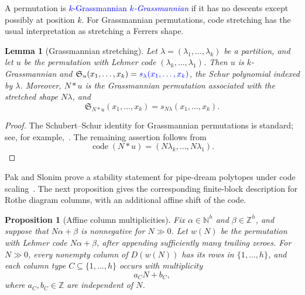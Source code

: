 \documentclass[11pt,reqno]{amsart}
\newtheorem{proposition}[theorem]{Proposition}
\newtheorem{lemma}[theorem]{Lemma}
\theoremstyle{definition}
\DeclareMathOperator{\code}{code}
\newcommand{\setN}{\mathbb{N}}
\newcommand{\setZ}{\mathbb{Z}}
\newcommand{\schubertS}{\mathfrak{S}}
\newcommand{\stretchop}{\mathbin{\ast}}
\newcommand{\stretchperm}[2]{#1\stretchop #2}
\newcommand{\defin}[1]{%
  \relax\ifmmode%
  \textcolor{blue}{#1}%
  \else\textcolor{blue}{\emph{#1}}%
  \fi%
}
\begin{document}
A permutation is \defin{\(k\)-Grassmannian} if it has no descents except
possibly at position \(k\).  For Grassmannian permutations, code stretching
has the usual interpretation as stretching a Ferrers shape.

\begin{lemma}[Grassmannian stretching]
\label{lem:grassmannianStretching}
Let \(\lambda=(\lambda_1,\dotsc,\lambda_k)\) be a partition, and let \(u\) be
the permutation with Lehmer code \((\lambda_k,\dotsc,\lambda_1)\).  Then
\(u\) is \(k\)-Grassmannian and
\(\schubertS_u(x_1,\dotsc,x_k)=\defin{s_\lambda(x_1,\dotsc,x_k)}\), the Schur
polynomial indexed by \(\lambda\).  Moreover,
\(\stretchperm{N}{u}\) is the Grassmannian permutation associated with the
stretched shape \(N\lambda\), and
\[
\schubertS_{\stretchperm{N}{u}}(x_1,\dotsc,x_k)
=
s_{N\lambda}(x_1,\dotsc,x_k).
\]
\end{lemma}

\begin{proof}
The Schubert--Schur identity for Grassmannian permutations is standard; see,
for example,~\cite{ReinerShimozono1995}.  The remaining assertion follows from
\[
\code(\stretchperm{N}{u})
=
(N\lambda_k,\dotsc,N\lambda_1).
\]
\end{proof}

Pak and Slonim prove a stability statement for pipe-dream polytopes under code
scaling~\cite[Rem.~4.4]{PakSlonim2026x}.  The next proposition gives the
corresponding finite-block description for Rothe diagram columns, with an
additional affine shift of the code.

\begin{proposition}[Affine column multiplicities]
\label{prop:affineColumnMultiplicities}
Fix \(\alpha\in\setN^h\) and \(\beta\in\setZ^h\), and suppose that
\(N\alpha+\beta\) is nonnegative for \(N\gg0\).  Let \(w(N)\) be the
permutation with Lehmer code \(N\alpha+\beta\), after appending sufficiently
many trailing zeroes.  For \(N\gg0\), every nonempty column of \(D(w(N))\)
has its rows in \(\{1,\dotsc,h\}\), and each column type
\(C\subseteq\{1,\dotsc,h\}\) occurs with multiplicity
\[
a_C N+b_C,
\]
where \(a_C,b_C\in\setZ\) are independent of \(N\).
\end{proposition}
\end{document}
